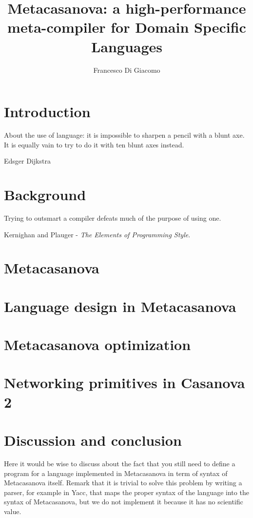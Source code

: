 \documentclass[8pt,a5paper]{extbook}
\author{Francesco Di Giacomo}
\title{Metacasanova: a high-performance meta-compiler for Domain Specific Languages}
\date { }
\theoremstyle{definition}
\begin{document}
\mainmatter
\maketitle

\tableofcontents



\chapter{Introduction}
\epigraph{About the use of language: it is impossible to sharpen a pencil with a blunt axe. It is equally vain to try to do it with ten blunt axes instead.}{Edsger Dijkstra}

\label{ch:introduction}
	

\chapter{Background}
\epigraph{Trying to outsmart a compiler defeats much of the purpose of using one.}{Kernighan and Plauger - \textit{The Elements of Programming Style}.}

\label{ch:background}
	
\chapter{Metacasanova}
		
\label{ch:metacasanova}

\chapter{Language design in Metacasanova}

\label{ch:languages}

\chapter{Metacasanova optimization}

	
\chapter{Networking primitives in Casanova 2}


\chapter{Discussion and conclusion}
Here it would be wise to discuss about the fact that you still need to define a program for a language implemented in Metacasanova in term of syntax of Metacasanova itself. Remark that it is trivial to solve this problem by writing a parser, for example in Yacc, that maps the proper syntax of the language into the syntax of Metacasanova, but we do not implement it because it has no scientific value.



\end{document}
